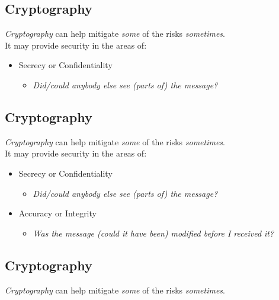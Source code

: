 \documentclass[xga]{xdvislides}
\begin{document}
\subsection{Cryptography}
{\em Cryptography} can help mitigate {\em some} of the risks {\em sometimes}.
\\

It may provide security in the areas of:
\begin{itemize}
	\item Secrecy or Confidentiality
		\begin{itemize}
			\item {\em Did/could anybody else see (parts of) the message?}
		\end{itemize}
\end{itemize}

\subsection{Cryptography}
{\em Cryptography} can help mitigate {\em some} of the risks {\em sometimes}.
\\

It may provide security in the areas of:
\begin{itemize}
	\item Secrecy or Confidentiality
		\begin{itemize}
			\item {\em Did/could anybody else see (parts of) the message?}
		\end{itemize}
	\item Accuracy or Integrity
		\begin{itemize}
			\item {\em Was the message (could it have been) modified before I received it?}
		\end{itemize}
\end{itemize}

\subsection{Cryptography}
{\em Cryptography} can help mitigate {\em some} of the risks {\em sometimes}.
\\
\end{document}
